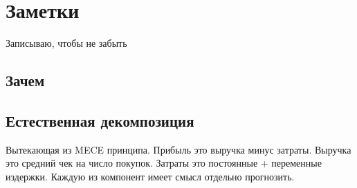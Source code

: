 \chapter{Заметки}
Записываю, чтобы не забыть

\section{Зачем}

\section{Естественная декомпозиция}
Вытекающая из MECE принципа. Прибыль это выручка минус затраты.
Выручка это средний чек на число покупок. Затраты это постоянные +
переменные издержки.
Каждую из компонент имеет смысл отдельно прогнозить.
